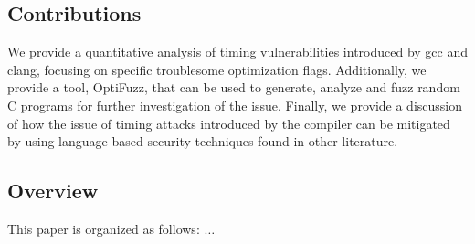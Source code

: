\subsection{Contributions}
We provide a quantitative analysis of timing vulnerabilities introduced by gcc and clang, focusing on specific troublesome optimization flags.
Additionally, we provide a tool, OptiFuzz, that can be used to generate, analyze and fuzz random C programs for further investigation of the issue.
Finally, we provide a discussion of how the issue of timing attacks introduced by the compiler can be mitigated by using language-based security techniques found in other literature.
\subsection{Overview}
This paper is organized as follows: $\ldots$ 
